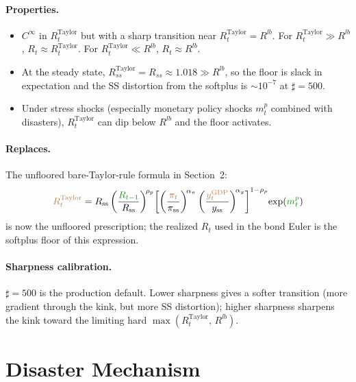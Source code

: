 \documentclass[11pt]{article}
\begin{document}
\paragraph{Properties.}
\begin{itemize}
\item $C^{\infty}$ in $R^{\text{Taylor}}_t$ but with a sharp transition
  near $R^{\text{Taylor}}_t = R^{lb}$. For $R^{\text{Taylor}}_t \gg R^{lb}$,
  $R_t \approx R^{\text{Taylor}}_t$. For $R^{\text{Taylor}}_t \ll R^{lb}$,
  $R_t \approx R^{lb}$.
\item At the steady state, $R^{\text{Taylor}}_{ss} = R_{ss} \approx 1.018 \gg R^{lb}$,
  so the floor is slack in expectation and the SS distortion from the
  softplus is ${\sim}10^{-7}$ at $\sharp = 500$.
\item Under stress shocks (especially monetary policy shocks $m_t^p$
  combined with disasters), $R^{\text{Taylor}}_t$ can dip below $R^{lb}$
  and the floor activates.
\end{itemize}

\paragraph{Replaces.}
The unfloored bare-Taylor-rule formula in Section~2:
\begin{equation*}
  \textcolor{brown}{R^{\text{Taylor}}_t}
    = R_{\text{ss}} \left(\frac{\textcolor{green!60!black}{R_{t-1}}}{R_{\text{ss}}}\right)^{\!\rho_p}
      \!\left[
        \left(\frac{\textcolor{orange!80!black}{\pi_t}}{\pi_{\text{ss}}}\right)^{\!\alpha_\pi}
        \left(\frac{\textcolor{brown}{y_t^{\text{GDP}}}}{y_{\text{ss}}}\right)^{\!\alpha_y}
      \right]^{1-\rho_p}
      \!\exp(\textcolor{green!60!black}{m_t^p})
\end{equation*}
is now the unfloored prescription; the realized $R_t$ used in the bond
Euler is the softplus floor of this expression.

\paragraph{Sharpness calibration.}
$\sharp = 500$ is the production default. Lower sharpness gives a
softer transition (more gradient through the kink, but more SS
distortion); higher sharpness sharpens the kink toward the limiting
hard $\max(R^{\text{Taylor}}_t,\, R^{lb})$.


\section{Disaster Mechanism}
\label{sec:disaster}
\end{document}
